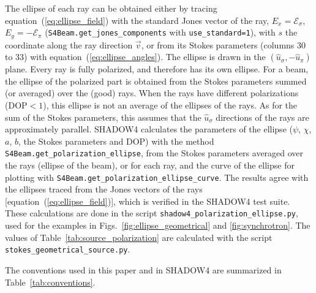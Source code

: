 \documentclass{iucr}
\begin{document}
The ellipse of each ray can be obtained either by tracing equation~(\ref{eq:ellipse_field}) with the standard Jones vector of the ray, $E_x=\mathcal{E}_\sigma$, $E_y=-\mathcal{E}_\pi$ ({\tt S4Beam.get\_jones\_components} with {\tt use\_standard=1}), with $s$ the coordinate along the ray direction $\vec{v}$, or from its Stokes parameters (columns 30 to 33) with equation~(\ref{eq:ellipse_angles}). The ellipse is drawn in the $(\hat{u}_\sigma,-\hat{u}_\pi)$ plane. Every ray is fully polarized, and therefore has its own ellipse. For a beam, the ellipse of the polarized part is obtained from the Stokes parameters summed (or averaged) over the (good) rays. When the rays have different polarizations (DOP$<1$), this ellipse is not an average of the ellipses of the rays. As for the sum of the Stokes parameters, this assumes that the $\hat{u}_\sigma$ directions of the rays are approximately parallel.
SHADOW4 calculates the parameters of the ellipse ($\psi$, $\chi$, $a$, $b$, the Stokes parameters and DOP) with the method {\tt S4Beam.get\_polarization\_ellipse}, from the Stokes parameters averaged over the rays (ellipse of the beam), or for each ray, and the curve of the ellipse for plotting with {\tt S4Beam.get\_polarization\_ellipse\_curve}. The results agree with the ellipses traced from the Jones vectors of the rays [equation~(\ref{eq:ellipse_field})], which is verified in the SHADOW4 test suite.
These calculations are done in the script {\tt shadow4\_polarization\_ellipse.py}, used for the examples in Figs.~\ref{fig:ellipse_geometrical} and \ref{fig:synchrotron}. The values of Table~\ref{tab:source_polarization} are calculated with the script {\tt stokes\_geometrical\_source.py}.

The conventions used in this paper and in SHADOW4 are summarized in Table~\ref{tab:conventions}.
\end{document}
